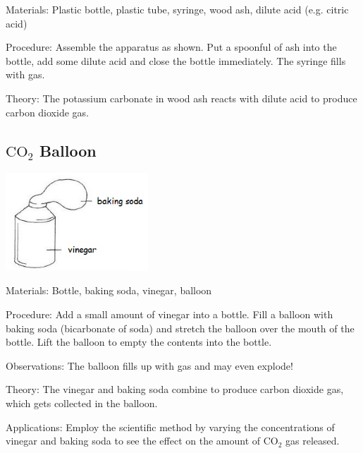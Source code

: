 \begin{multicols}{2}
\begin{description*}
\item[Materials:]{Plastic bottle, plastic tube, syringe, wood ash, dilute acid (e.g. citric acid)}
\item[Procedure:]{Assemble the apparatus as shown. Put a
spoonful of ash into the bottle, add some dilute
acid and close the bottle
immediately. The syringe fills with gas.}
\item[Theory:]{The potassium carbonate in wood ash reacts
with dilute acid to produce carbon dioxide gas.}
\end{description*}

\subsection{$\mathrm{CO_2}$ Balloon}

\begin{center}
\includegraphics[width=0.4\textwidth]{./img/vso/co2-balloon.jpg}
\end{center}

\begin{description*}
\item[Materials:]{Bottle, baking soda, vinegar, balloon}
\item[Procedure:]{Add a small amount of vinegar into a bottle. Fill a balloon with baking soda (bicarbonate of soda) and stretch the balloon over the mouth of the bottle. Lift the balloon to empty the contents into the bottle.}
\item[Observations:]{The balloon fills up with gas and may even explode!}
\item[Theory:]{The vinegar and baking soda combine to produce carbon dioxide gas, which gets collected in the balloon.}
\item[Applications:]{Employ the scientific method by varying the concentrations of vinegar and baking soda to see the effect on the amount of CO$_2$ gas released.}
\end{description*}


\end{multicols}
